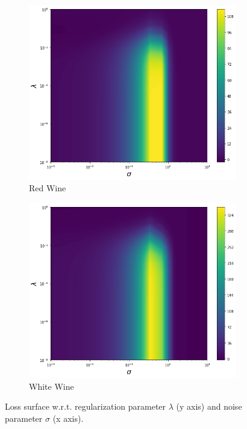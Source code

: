 \begin{figure}[H]
    \begin{subfigure}[b]{0.32\textwidth}
        \includegraphics[width=\textwidth]{figures/score_matching/loss/lossRedWine.png}
        \caption{Red Wine}
    \end{subfigure}
    \begin{subfigure}[b]{0.32\textwidth}
        \includegraphics[width=\textwidth]{figures/score_matching/loss/lossWhiteWine.png}
        \caption{White Wine}
    \end{subfigure}
    \caption{Loss surface w.r.t. regularization parameter $\lambda$ (y axis) and noise parameter $\sigma$ (x axis).}
    \label{fig:lossdemo_app}
\end{figure}

